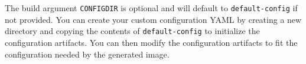 
The build argument \texttt{CONFIG\textunderscore DIR} is optional and will default to \texttt{default-config} 
if not provided.  You can create your custom \scaresolver configuration YAML by creating a 
new directory and copying the contents of \texttt{default-config} to initialize the configuration 
artifacts.  You can then modify the configuration artifacts to fit the configuration needed 
by the generated image.

